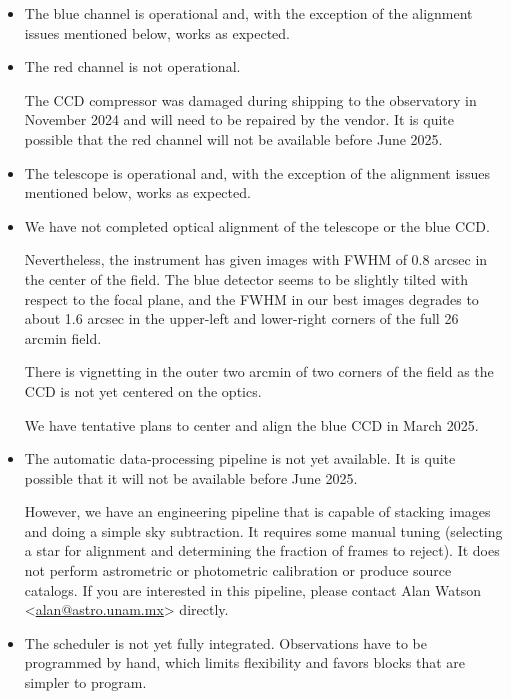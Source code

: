\begin{itemize}

\item 
The blue channel is operational and, with the exception of the alignment issues mentioned below, works as expected. 

\item 
The red channel is not operational. 

The CCD compressor was damaged during shipping to the observatory in November 2024 and will need to be repaired by the vendor. It is quite possible that the red channel will not be available before June 2025.

\item 
The telescope is operational and, with the exception of the alignment issues mentioned below, works as expected. 

\item
We have not completed optical alignment of the telescope or the blue CCD. 

Nevertheless, the instrument has given images with FWHM of 0.8 arcsec in the center of the field. The blue detector seems to be slightly tilted with respect to the focal plane, and the FWHM in our best images degrades to about 1.6 arcsec in the upper-left and lower-right corners of the full 26 arcmin field. 

There is vignetting in the outer two arcmin of two corners of the field as the CCD is not yet centered on the optics.

We have tentative plans to center and align the blue CCD in March 2025.

\item
The automatic data-processing pipeline is not yet available. It is quite possible that it will not be available before June 2025. 

However, we have an engineering pipeline that is capable of stacking images and doing a simple sky subtraction. It requires some manual tuning (selecting a star for alignment and determining the fraction of frames to reject). It does not perform astrometric or photometric calibration or produce source catalogs. If you are interested in this pipeline, please contact Alan Watson <\href{mailto:alan@astro.unam.mx}{alan@astro.unam.mx}> directly.

\item
The scheduler is not yet fully integrated. Observations have to be programmed by hand, which limits flexibility and favors blocks that are simpler to program.

\end{itemize}
